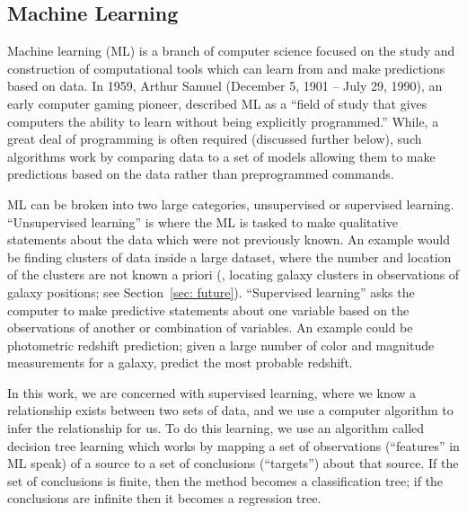 \subsection{Machine Learning}
Machine learning (ML) is a branch of computer science focused on the study and construction of computational tools which can learn from and make predictions based on data. In 1959, Arthur Samuel (December 5, 1901 -- July 29, 1990), an early computer gaming pioneer, described ML as a ``field of study that gives computers the ability to learn without being explicitly programmed.''  While, a great deal of programming is often required (discussed further below), such algorithms work by comparing data to a set of models allowing them to make predictions based on the data rather than preprogrammed commands.

ML can be broken into two large categories, unsupervised or supervised learning. ``Unsupervised learning'' is where the ML is tasked to make qualitative statements about the data which were not previously known. An example would be finding clusters of data inside a large dataset, where the number and location of the clusters are not known a priori (\eg, locating galaxy clusters in observations of galaxy positions; see Section~\ref{sec: future}). ``Supervised learning'' asks the computer to make predictive statements about one variable based on the observations of another or combination of variables. An example could be photometric redshift prediction; given a large number of color and magnitude measurements for a galaxy, predict the most probable redshift.  

In this work, we are concerned with supervised learning, where we know a relationship exists between two sets of data, and we use a computer algorithm to infer the relationship for us. To do this learning, we use an algorithm called decision tree learning which works by mapping a set of observations (``features'' in ML speak) of a source to a set of conclusions (``targets'') about that source. If the set of conclusions is finite, then the method becomes a classification tree; if the conclusions are infinite then it becomes a regression tree. 

